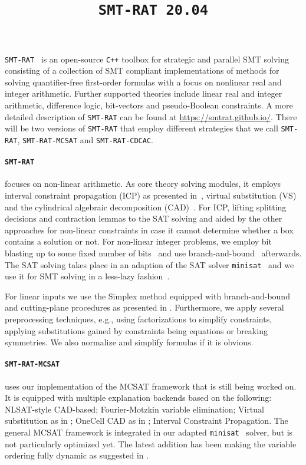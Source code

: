 \documentclass{article}
\title{\texttt{SMT-RAT 20.04}}
\begin{document}
\maketitle

\texttt{SMT-RAT}~\cite{Corzilius2015} is an open-source \texttt{C++} toolbox for strategic and parallel SMT solving
consisting of a collection of SMT compliant implementations of methods for
solving quantifier-free first-order formulas with a focus on nonlinear real and integer arithmetic.
Further supported theories include linear real and integer arithmetic, difference logic, bit-vectors and pseudo-Boolean constraints.
A more detailed description of \texttt{SMT-RAT} can be found at \href{https://smtrat.github.io/}{\color{blue}https://smtrat.github.io/}.
There will be two versions of \texttt{SMT-RAT} that employ different strategies that we call \texttt{SMT-RAT}, \texttt{SMT-RAT-MCSAT} and \texttt{SMT-RAT-CDCAC}.

\paragraph{\texttt{SMT-RAT}} focuses on non-linear arithmetic.
As core theory solving modules, it employs interval constraint propagation (ICP) as presented in~\cite{GGIGSC10}, virtual substitution (VS)~\cite{Article_Corzilius_FCT2011} and the cylindrical algebraic decomposition (CAD)~\cite{Loup2013}. For ICP, lifting splitting decisions and contraction lemmas to the SAT solving and aided by the other approaches for non-linear constraints in case it cannot determine whether a box contains a solution or not. For non-linear integer problems, we employ bit blasting up to some fixed number of bits~\cite{kruger2015bitvectors} and use branch-and-bound~\cite{Kremer2016} afterwards.
The SAT solving takes place in an adaption of the SAT solver \texttt{minisat}~\cite{Een2003} and we use it for SMT solving in a less-lazy fashion~\cite{sebastiani2007lazy}.

For linear inputs we use the Simplex method equipped with branch-and-bound and cutting-plane procedures as presented in \cite{DM06}.
Furthermore, we apply several preprocessing techniques, e.g., using factorizations to simplify constraints, applying substitutions gained by constraints being equations or breaking symmetries. We also normalize and simplify formulas if it is obvious.

\paragraph{\texttt{SMT-RAT-MCSAT}} uses our implementation of the MCSAT framework \cite{Moura2013} that is still being worked on.
It is equipped with multiple explanation backends based on the following: NLSAT-style CAD-based; Fourier-Motzkin variable elimination; Virtual substitution as in \cite{Abraham2017}; OneCell CAD as in \cite{Neuss2018}; Interval Constraint Propagation.
The general MCSAT framework is integrated in our adapted \texttt{minisat}~\cite{Een2003} solver, but is not particularly optimized yet.
The latest addition has been making the variable ordering fully dynamic as suggested in \cite{Jovanovic2013}.
\end{document}
